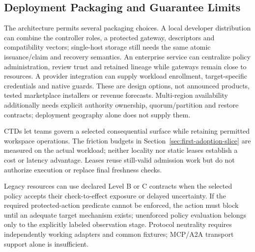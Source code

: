 \subsection{Deployment Packaging and Guarantee Limits}
The architecture permits several packaging choices. A local developer distribution can combine the controller roles, a protected gateway, descriptors and compatibility vectors; single-host storage still needs the same atomic issuance/claim and recovery semantics. An enterprise service can centralize policy administration, review trust and retained lineage while gateways remain close to resources. A provider integration can supply workload enrollment, target-specific credentials and native guards. These are design options, not announced products, tested marketplace installers or revenue forecasts. Multi-region availability additionally needs explicit authority ownership, quorum/partition and restore contracts; deployment geography alone does not supply them.

CTDs let teams govern a selected consequential surface while retaining permitted workspace operations. The friction budgets in Section~\ref{sec:first-adoption-slice} are measured on the actual workload; neither locality nor static leases establish a cost or latency advantage. Leases reuse still-valid admission work but do not authorize execution or replace final freshness checks.

Legacy resources can use declared Level B or C contracts when the selected policy accepts their check-to-effect exposure or delayed uncertainty. If the required protected-action predicate cannot be enforced, the action must block until an adequate target mechanism exists; unenforced policy evaluation belongs only to the explicitly labeled observation stage. Protocol neutrality requires independently working adapters and common fixtures; MCP/A2A transport support alone is insufficient.



